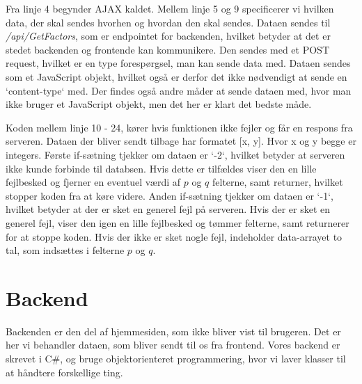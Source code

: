 \documentclass[a4paper,12pt]{extarticle}
\begin{document}
    \medskip

    Fra linje 4 begynder AJAX kaldet.
    Mellem linje 5 og 9 specificerer vi hvilken data, der skal sendes hvorhen og hvordan den skal sendes.
    Dataen sendes til \emph{/api/GetFactors}, som er endpointet for backenden, hvilket betyder at det er stedet backenden og frontende kan kommunikere.
    Den sendes med et POST request, hvilket er en type forespørgsel, man kan sende data med.
    Dataen sendes som et JavaScript objekt, hvilket også er derfor det ikke nødvendigt at sende en `content-type` med.
    Der findes også andre måder at sende dataen med, hvor man ikke bruger et JavaScript objekt, men det her er klart det bedste måde.

    \medskip

    Koden mellem linje 10 - 24, kører hvis funktionen ikke fejler og får en respons fra serveren.
    Dataen der bliver sendt tilbage har formatet [x, y]. Hvor x og y begge er integers.
    Første if-sætning tjekker om dataen er `-2`, hvilket betyder at serveren ikke kunde forbinde til databsen.
    Hvis dette er tilfældes viser den en lille fejlbesked og fjerner en eventuel værdi af $p$ og $q$ felterne, samt returner, hvilket stopper koden fra at køre videre.
    Anden if-sætning tjekker om dataen er `-1`, hvilket betyder at der er sket en generel fejl på serveren.
    Hvis der er sket en generel fejl, viser den igen en lille fejlbesked og tømmer felterne, samt returnerer for at stoppe koden.
    Hvis der ikke er sket nogle fejl, indeholder data-arrayet to tal, som indsættes i felterne $p$ og $q$.


    \section{Backend}\label{sec:backend}
    Backenden er den del af hjemmesiden, som ikke bliver vist til brugeren.
    Det er her vi behandler dataen, som bliver sendt til os fra frontend.
    Vores backend er skrevet i C\#, og bruge objektorienteret programmering, hvor vi laver klasser til at håndtere forskellige ting.
\end{document}
